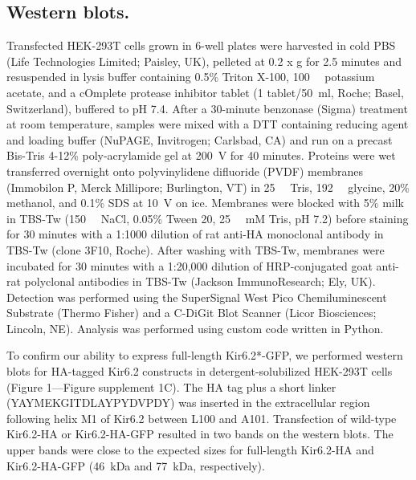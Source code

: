 \documentclass[10pt,lineno, doublespacing]{elife_modified}
\begin{document}
\subsection{Western blots.}
Transfected HEK-293T cells grown in 6-well plates were harvested in cold PBS (Life Technologies Limited; Paisley, UK), pelleted at 0.2 x g for 2.5 minutes and resuspended in lysis buffer containing 0.5\% Triton X-100, \SI{100}{\milli\Molar} potassium acetate, and a cOmplete protease inhibitor tablet (1 tablet/\SI{50}{\milli\litre}, Roche; Basel, Switzerland), buffered to pH 7.4.
After a 30-minute benzonase (Sigma) treatment at room temperature, samples were mixed with a DTT containing reducing agent and loading buffer (NuPAGE, Invitrogen; Carlsbad, CA) and run on a precast Bis-Tris 4-12\% poly-acrylamide gel at \SI{200}{\volt} for 40 minutes.
Proteins were wet transferred overnight onto polyvinylidene difluoride (PVDF) membranes (Immobilon P, Merck Millipore; Burlington, VT) in \SI{25}{\milli\Molar} Tris, \SI{192}{\milli\Molar} glycine, 20\% methanol, and 0.1\% SDS at \SI{10}{\volt} on ice.
Membranes were blocked with 5\% milk in TBS-Tw (\SI{150}{\milli\Molar} NaCl, 0.05\% Tween 20, \SI{25}{\milli\Molar} mM Tris, pH 7.2) before staining for 30 minutes with a 1:1000 dilution of rat anti-HA monoclonal antibody in TBS-Tw (clone 3F10, Roche).
After washing with TBS-Tw, membranes were incubated for 30 minutes with a 1:20,000 dilution of HRP-conjugated goat anti-rat polyclonal antibodies in TBS-Tw (Jackson ImmunoResearch; Ely, UK).
Detection was performed using the SuperSignal West Pico Chemiluminescent Substrate (Thermo Fisher) and a C-DiGit Blot Scanner (Licor Biosciences; Lincoln, NE).
Analysis was performed using custom code written in Python.

To confirm our ability to express full-length Kir6.2*-GFP, we performed western blots for HA-tagged Kir6.2 constructs in detergent-solubilized HEK-293T cells (Figure 1—Figure supplement 1C).
The HA tag plus a short linker (YAYMEKGITDLAYPYDVPDY) was inserted in the extracellular region following helix M1 of Kir6.2 between L100 and A101.
Transfection of wild-type Kir6.2-HA or Kir6.2-HA-GFP resulted in two bands on the western blots.
The upper bands were close to the expected sizes for full-length Kir6.2-HA and Kir6.2-HA-GFP (\SI{46}{\kilo\dalton} and \SI{77}{\kilo\dalton}, respectively).
\end{document}
